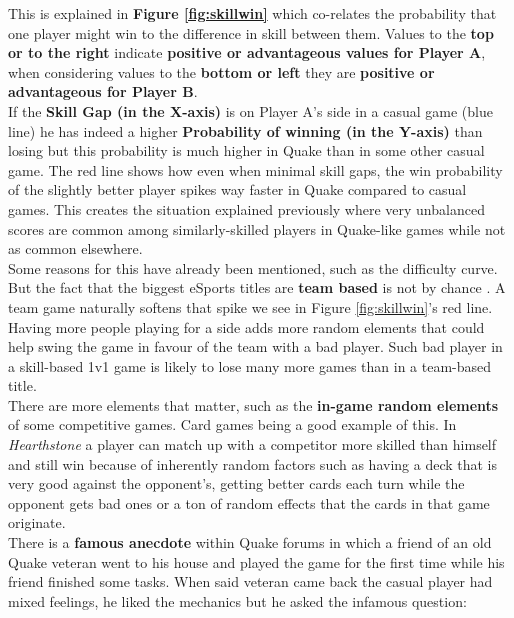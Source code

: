 This is explained in \textbf{Figure \ref{fig:skillwin}} which co-relates the probability that one player might win to the difference in skill between them. Values to the \textbf{top or to the right} indicate \textbf{positive or advantageous values for Player A}, when considering values to the \textbf{bottom or left} they are \textbf{positive or advantageous for Player B}.\\

If the \textbf{Skill Gap (in the X-axis)} is on Player A's side in a casual game (blue line) he has indeed a higher \textbf{Probability of winning (in the Y-axis)} than losing but this probability is much higher in Quake than in some other casual game. The red line shows how even when minimal skill gaps, the win probability of the slightly better player spikes way faster in Quake compared to casual games. This creates the situation explained previously where very unbalanced scores are common among similarly-skilled players in Quake-like games while not as common elsewhere.\\

Some reasons for this have already been mentioned, such as the difficulty curve. But the fact that the biggest eSports titles are \textbf{team based} is not by chance \parencite[p.~12]{van2013video}. A team game naturally softens that spike we see in Figure \ref{fig:skillwin}'s red line. Having more people playing for a side adds more random elements that could help swing the game in favour of the team with a bad player. Such bad player in a skill-based 1v1 game is likely to lose many more games than in a team-based title.\\

There are more elements that matter, such as the \textbf{in-game random elements} of some competitive games. Card games being a good example of this. In \textit{Hearthstone} \citep{game:hs} a player can match up with a competitor more skilled than himself and still win because of inherently random factors such as having a deck that is very good against the opponent's, getting better cards each turn while the opponent gets bad ones or a ton of random effects that the cards in that game originate.\\

There is a \textbf{famous anecdote} within Quake forums in which a friend of an old Quake veteran went to his house and played the game for the first time while his friend finished some tasks. When said veteran came back the casual player had mixed feelings, he liked the mechanics but he asked the infamous question:

